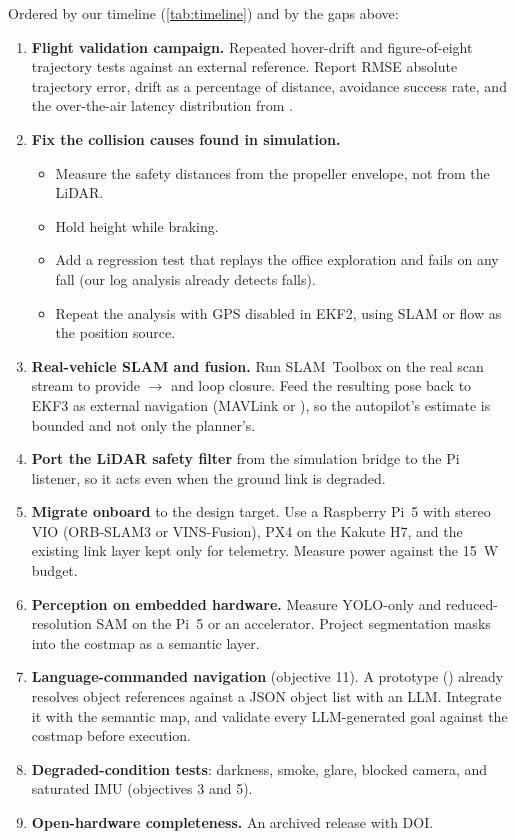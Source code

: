 Ordered by our timeline (\cref{tab:timeline}) and by the gaps above:
\begin{enumerate}[leftmargin=*,itemsep=2pt]
  \item \textbf{Flight validation campaign.} Repeated hover-drift and figure-of-eight
    trajectory tests against an external reference. Report RMSE absolute trajectory
    error, drift as a percentage of distance, avoidance success rate, and the
    over-the-air latency distribution from .
  \item \textbf{Fix the collision causes found in simulation.}
    \begin{itemize}[nosep]
      \item Measure the safety distances from the propeller envelope, not from the
        LiDAR.
      \item Hold height while braking.
      \item Add a regression test that replays the office exploration and fails on any
        fall (our log analysis already detects falls).
      \item Repeat the analysis with GPS disabled in EKF2, using SLAM or flow as the
        position source.
    \end{itemize}
  \item \textbf{Real-vehicle SLAM and fusion.} Run SLAM~Toolbox on the real scan stream
    to provide $\rightarrow$ and loop closure. Feed the resulting
    pose back to EKF3 as external navigation (MAVLink 
    or ), so the autopilot's estimate is bounded and not only the
    planner's.
  \item \textbf{Port the LiDAR safety filter} from the simulation bridge to the Pi
    listener, so it acts even when the ground link is degraded.
  \item \textbf{Migrate onboard} to the design target. Use a Raspberry Pi~5 with stereo
    VIO (ORB-SLAM3 or VINS-Fusion), PX4 on the Kakute H7, and the existing link layer
    kept only for telemetry. Measure power against the \SI{15}{\watt} budget.
  \item \textbf{Perception on embedded hardware.} Measure YOLO-only and
    reduced-resolution SAM on the Pi~5 or an accelerator. Project segmentation masks
    into the costmap as a semantic layer.
  \item \textbf{Language-commanded navigation} (objective 11). A prototype
    () already resolves object references against a
    JSON object list with an LLM. Integrate it with the semantic map, and validate
    every LLM-generated goal against the costmap before execution.
  \item \textbf{Degraded-condition tests}: darkness, smoke, glare, blocked camera, and
    saturated IMU (objectives 3 and 5).
  \item \textbf{Open-hardware completeness.} An archived release with DOI.
\end{enumerate}

